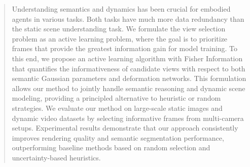 \begin{abstract}
Understanding semantics and dynamics has been crucial for embodied agents in various tasks.
Both tasks have much more data redundancy than the static scene understanding task.
We formulate the view selection problem as an active learning problem, where the goal is to prioritize frames that provide the greatest information gain for model training. To this end, we propose an active learning algorithm with Fisher Information that quantifies the informativeness of candidate views with respect to both semantic Gaussian parameters and deformation networks. This formulation allows our method to jointly handle semantic reasoning and dynamic scene modeling, providing a principled alternative to heuristic or random strategies. We evaluate our method on large-scale static images and dynamic video datasets by selecting informative frames from multi-camera setups. Experimental results demonstrate that our approach consistently improves rendering quality and semantic segmentation performance, outperforming baseline methods based on random selection and uncertainty-based heuristics.
\end{abstract}